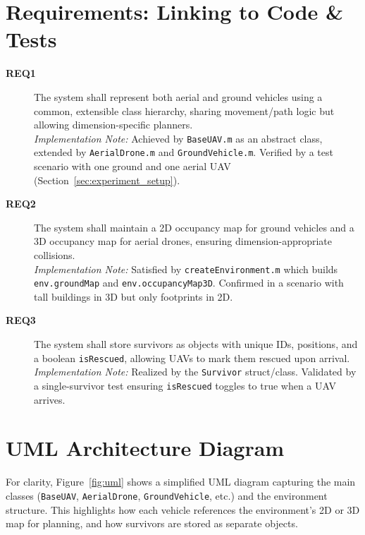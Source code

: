 \documentclass[12pt,a4paper]{report}
\begin{document}
\section{Requirements: Linking to Code \& Tests}
\begin{description}
  \item[\textbf{REQ1}] The system shall represent both aerial and ground vehicles using
  a common, extensible class hierarchy, sharing movement/path logic but allowing dimension-specific
  planners. 
  \\
  \textit{Implementation Note:} Achieved by \texttt{BaseUAV.m} as an abstract class, 
  extended by \texttt{AerialDrone.m} and \texttt{GroundVehicle.m}. Verified by a test 
  scenario with one ground and one aerial UAV (Section~\ref{sec:experiment_setup}).

  \item[\textbf{REQ2}] The system shall maintain a 2D occupancy map for ground vehicles
  and a 3D occupancy map for aerial drones, ensuring dimension-appropriate collisions.
  \\
  \textit{Implementation Note:} Satisfied by \texttt{createEnvironment.m} which builds 
  \texttt{env.groundMap} and \texttt{env.occupancyMap3D}. Confirmed in a scenario with tall 
  buildings in 3D but only footprints in 2D. 

  \item[\textbf{REQ3}] The system shall store survivors as objects with unique IDs,
  positions, and a boolean \texttt{isRescued}, allowing UAVs to mark them rescued upon arrival.
  \\
  \textit{Implementation Note:} Realized by the \texttt{Survivor} struct/class. 
  Validated by a single-survivor test ensuring \texttt{isRescued} toggles to true when 
  a UAV arrives.
\end{description}

\section{UML Architecture Diagram}
\label{sec:uml_section}
For clarity, Figure~\ref{fig:uml} shows a simplified UML diagram capturing the main classes 
(\texttt{BaseUAV}, \texttt{AerialDrone}, \texttt{GroundVehicle}, etc.) and the environment 
structure. This highlights how each vehicle references the environment’s 2D or 3D map for 
planning, and how survivors are stored as separate objects.
\end{document}
